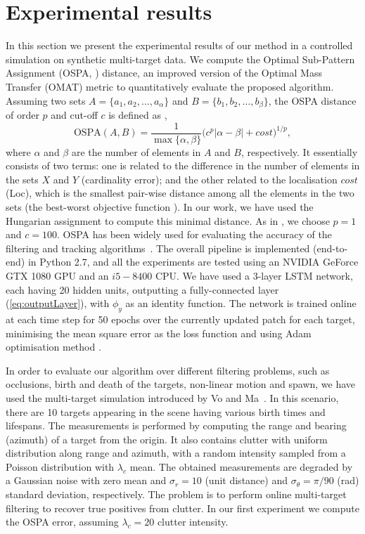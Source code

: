 \documentclass[runningheads]{llncs}
\begin{document}
\section{Experimental results}\label{sec:expRes}
In this section we present the experimental results of our method in a controlled simulation on synthetic multi-target data.
We compute the Optimal Sub-Pattern Assignment (OSPA, \cite{Schuhmacher:2008}) distance, an improved version of the Optimal Mass Transfer (OMAT) metric to quantitatively evaluate the proposed algorithm. Assuming two sets $A=\{a_1,a_2,\ldots,a_\alpha\}$ and $B=\{b_1,b_2,\ldots,b_\beta\}$, the OSPA distance of order $p$ and cut-off $c$ is defined as \cite{Schuhmacher:2008},
\begin{equation}
\textrm{OSPA}(A,B) = \frac{1}{\max\{\alpha,\beta\}} \bigg( c^p |\alpha-\beta| + cost \bigg)^{1/p},
\label{eq:OSPA}
\end{equation}
where $\alpha$ and $\beta$ are the number of elements in $A$ and $B$, respectively. It essentially consists of two terms: one is related to the difference in the number of elements in the sets $X$ and $Y$ (cardinality error); and the other related to the localisation $cost$ (Loc), which is the smallest pair-wise distance among all the elements in the two sets (the best-worst objective function \cite{Emambakhsh:2017}). In our work, we have used the Hungarian assignment to compute this minimal distance. As in \cite{Schuhmacher:2008}, we choose $p=1$ and $c=100$. OSPA has been widely used for evaluating the accuracy of the filtering and tracking algorithms~\cite{Vo:2017,Fantacci:2018}. 
The overall pipeline is implemented (end-to-end) in Python 2.7, and all the experiments are tested using an NVIDIA GeForce GTX 1080 GPU and an $i5-8400$ CPU. We have used a 3-layer LSTM network, each having 20 hidden units, outputting a fully-connected layer (\ref{eq:outputLayer}), with $\phi_y$ as an identity function. 
The network is trained online at each time step for 50 epochs over the currently updated patch for each target, minimising the mean square error as the loss function and using Adam optimisation method \cite{kingma2014adam}.

In order to evaluate our algorithm over different filtering problems, such as occlusions, birth and death of the targets, non-linear motion and spawn, we have used the multi-target simulation introduced by Vo and Ma~\cite{Reuter:2014,Vo:2014}. In this scenario, there are 10 targets appearing in the scene having various birth times and lifespans. The measurements is performed by computing the range and bearing (azimuth) of a target from the origin. It also contains clutter with uniform distribution along range and azimuth, with a random intensity sampled from a Poisson distribution with $\lambda_c$ mean. The obtained measurements are degraded by a Gaussian noise with zero mean and $\sigma_r=10$ (unit distance) and $\sigma_\theta=\pi/90$ (rad) standard deviation, respectively. The problem is to perform online multi-target filtering to recover true positives from clutter.
In our first experiment we compute the OSPA error, assuming $\lambda_c = 20$ clutter intensity. 
\end{document}
